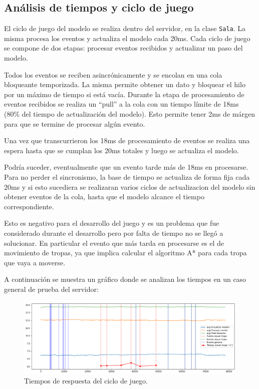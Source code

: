 \documentclass[titlepage,a4paper,12pt]{article}
\begin{document}
\subsection{Análisis de tiempos y ciclo de juego}
El ciclo de juego del modelo se realiza dentro del servidor, en la clase \texttt{Sala}. La misma procesa los eventos y actualiza el modelo cada 20ms. Cada ciclo de juego se compone de dos etapas: procesar eventos recibidos y actualizar un paso del modelo.

Todos los eventos se reciben asincrónicamente y se encolan en una cola bloqueante temporizada. La misma permite obtener un dato y bloquear el hilo por un máximo de tiempo si está vacía. Durante la etapa de procesamiento de eventos recibidos se realiza un ``pull'' a la cola con un tiempo límite de 18ms (80\% del tiempo de actualización del modelo). Esto permite tener 2ms de márgen para que se termine de procesar algún evento.

Una vez que transcurrieron los 18ms de procesamiento de eventos se realiza una espera hasta que se cumplan los 20ms totales y luego se actualiza el modelo.

Podría suceder, eventualmente que un evento tarde más de 18ms en procesarse. Para no perder el sincronismo, la base de tiempo se actualiza de forma fija cada 20ms y si esto sucediera se realizaran varios ciclos de actualizacion del modelo sin obtener eventos de la cola, hasta que el modelo alcance el tiempo correspondiente.

Esto es negativo para el desarrollo del juego y es un problema que fue considerado durante el desarrollo pero por falta de tiempo no se llegó a solucionar. En particular el evento que más tarda en procesarse es el de movimiento de tropas, ya que implica calcular el algoritmo A* para cada tropa que vaya a moverse.

A continuación se muestra un gráfico donde se analizan los tiempos en un caso general de prueba del servidor:

\begin{figure}[H]
	\centering
	\includegraphics[width=16cm]{../imagenes/analisis-tiempos-1.png}
	\caption{\label{fig:tiempos-ciclo-juego-1} Tiempos de respuesta del ciclo de juego.}
\end{figure}
\end{document}

